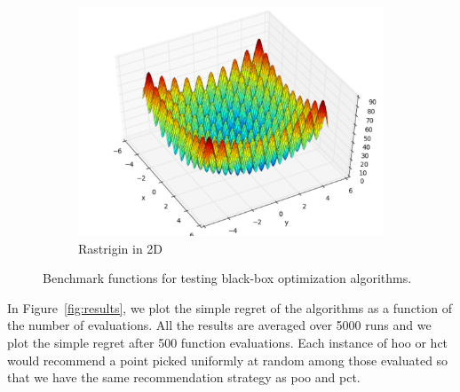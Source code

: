 \begin{figure}[ht]
\begin{subfigure}{0.33\textwidth}
    \centering\includegraphics[width=\textwidth]{Chapter5/img/rastrigin.pdf}
    \caption{Rastrigin in 2D}
  \end{subfigure}
  \caption{Benchmark functions for testing black-box optimization algorithms.}
  \label{fig:benchmarks}
\end{figure}

In Figure~\ref{fig:results}, we plot the simple regret of the algorithms as a function of the number of evaluations. All the results are averaged over 5000 runs and we plot the simple regret after 500 function evaluations. Each instance of \gls{hoo} or \gls{hct} would recommend a point picked uniformly at random among those evaluated so that we have the same recommendation strategy as \gls{poo} and \gls{pct}.

